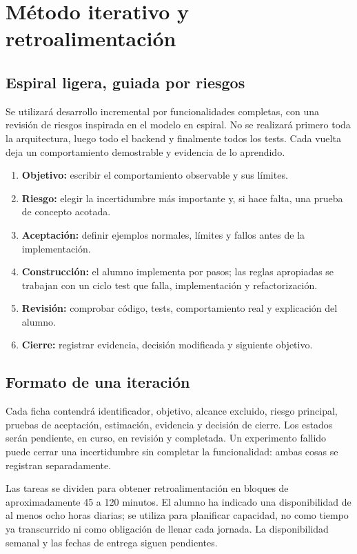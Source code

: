 \chapter{Método iterativo y retroalimentación}
\section{Espiral ligera, guiada por riesgos}
Se utilizará desarrollo incremental por funcionalidades completas, con una revisión de riesgos inspirada en el modelo en espiral. No se realizará primero toda la arquitectura, luego todo el backend y finalmente todos los tests. Cada vuelta deja un comportamiento demostrable y evidencia de lo aprendido.

\begin{enumerate}
\item \textbf{Objetivo:} escribir el comportamiento observable y sus límites.
\item \textbf{Riesgo:} elegir la incertidumbre más importante y, si hace falta, una prueba de concepto acotada.
\item \textbf{Aceptación:} definir ejemplos normales, límites y fallos antes de la implementación.
\item \textbf{Construcción:} el alumno implementa por pasos; las reglas apropiadas se trabajan con un ciclo test que falla, implementación y refactorización.
\item \textbf{Revisión:} comprobar código, tests, comportamiento real y explicación del alumno.
\item \textbf{Cierre:} registrar evidencia, decisión modificada y siguiente objetivo.
\end{enumerate}

\section{Formato de una iteración}
Cada ficha contendrá identificador, objetivo, alcance excluido, riesgo principal, pruebas de aceptación, estimación, evidencia y decisión de cierre. Los estados serán pendiente, en curso, en revisión y completada. Un experimento fallido puede cerrar una incertidumbre sin completar la funcionalidad: ambas cosas se registran separadamente.

Las tareas se dividen para obtener retroalimentación en bloques de aproximadamente 45 a 120 minutos. El alumno ha indicado una disponibilidad de al menos ocho horas diarias; se utiliza para planificar capacidad, no como tiempo ya transcurrido ni como obligación de llenar cada jornada. La disponibilidad semanal y las fechas de entrega siguen pendientes.


